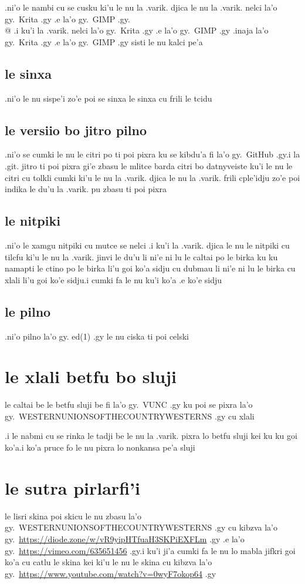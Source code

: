 \documentclass{report}
\begin{document}
.ni'o le nambi cu se cusku ki'u le nu la .varik. djica le nu la .varik. nelci la'o gy.\ Krita .gy .e la'o gy.\ GIMP .gy.\\@  .i ku'i la .varik. nelci la'o gy.\ Krita .gy .e la'o gy.\ GIMP .gy .inaja la'o gy.\ Krita .gy .e la'o gy.\ GIMP .gy sisti le nu kalci pe'a
\subsection{le sinxa}
.ni'o le nu sispe'i zo'e poi se sinxa le sinxa cu frili le tcidu
\subsection{le versiio bo jitro pilno}
.ni'o se cumki le nu le citri po ti poi pixra ku se kibdu'a fi la'o gy.\ GitHub .gy\@  .i la .git. jitro ti poi pixra gi'e zbasu le mlitce barda citri bo datnyveiste
ku'i le nu le citri cu tolkli cumki ki'u le nu la .varik. djica le nu la .varik. frili cple'idju zo'e poi indika le du'u la .varik. pu zbasu ti poi pixra
\subsection{le nitpiki}
.ni'o le xamgu nitpiki cu mutce se nelci  .i ku'i la .varik. djica le nu le nitpiki cu tilcfu ki'u le nu la .varik. jinvi le du'u li ni'e ni lu le caltai po le birka ku ku namapti le ctino po le birka li'u goi ko'a sidju cu dubmau li ni'e ni lu le birka cu xlali li'u goi ko'e sidju\@  .i cumki fa le nu ku'i ko'a .e ko'e sidju
\subsection{le pilno}
.ni'o pilno la'o gy. ed(1) .gy le nu ciska ti poi celski
\section{le xlali betfu bo sluji}
le caltai be le betfu sluji be fi la'o gy.\ VUNC .gy ku poi se pixra la'o gy.\ WESTERNUNIONSOFTHECOUNTRYWESTERNS .gy cu xlali

.i le nabmi cu se rinka le tadji be le nu la .varik. pixra lo betfu sluji kei ku ku goi ko'a\@  .i ko'a pruce fo le nu pixra lo nonkansa pe'a sluji
\section{le sutra pirlarfi'i}
le lisri skina poi skicu le nu zbasu la'o gy.\ WESTERNUNIONSOFTHECOUNTRYWESTERNS .gy cu kibzva la'o gy.\ \url{https://diode.zone/w/vR9yipHTfuaH3SKPiEXFLm} .gy .e la'o gy.\ \url{https://vimeo.com/635651456} .gy\@  .i ku'i ji'a cumki fa le nu lo mabla jifkri goi ko'a cu catlu le skina kei ki'u le nu le skina cu kibzva la'o gy.\ \url{https://www.youtube.com/watch?v=0wyF7okop64} .gy
\end{document}
